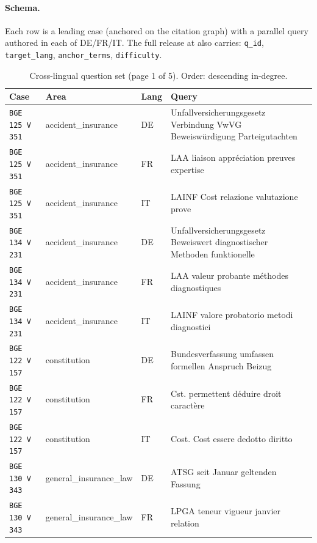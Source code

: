 \paragraph{Schema.} Each row is a leading case (anchored on the citation graph) with a parallel query authored in each of DE/FR/IT. The full release at  also carries: \texttt{q\_id}, \texttt{target\_lang}, \texttt{anchor\_terms}, \texttt{difficulty}.

\renewcommand{\arraystretch}{1.15}
\begin{table}[h]
\centering
\caption{Cross-lingual question set (page 1 of 5). Order: descending in-degree.}
\scriptsize
\setlength{\tabcolsep}{2pt}
\begin{tabular}{>{\raggedright\arraybackslash}p{2.2cm} >{\raggedright\arraybackslash}p{3.55cm} >{\raggedright\arraybackslash}p{0.8cm} >{\raggedright\arraybackslash}p{8.05cm}}
\toprule
\textbf{Case} & \textbf{Area} & \textbf{Lang} & \textbf{Query} \\
\midrule
\texttt{BGE 125 V 351} & accident\_insurance & DE & Unfallversicherungsgesetz Verbindung VwVG Beweiswürdigung Parteigutachten \\
\texttt{BGE 125 V 351} & accident\_insurance & FR & LAA liaison appréciation preuves expertise \\
\texttt{BGE 125 V 351} & accident\_insurance & IT & LAINF Cost relazione valutazione prove \\
\texttt{BGE 134 V 231} & accident\_insurance & DE & Unfallversicherungsgesetz Beweiswert diagnostischer Methoden funktionelle \\
\texttt{BGE 134 V 231} & accident\_insurance & FR & LAA valeur probante méthodes diagnostiques \\
\texttt{BGE 134 V 231} & accident\_insurance & IT & LAINF valore probatorio metodi diagnostici \\
\texttt{BGE 122 V 157} & constitution & DE & Bundesverfassung umfassen formellen Anspruch Beizug \\
\texttt{BGE 122 V 157} & constitution & FR & Cst. permettent déduire droit caractère \\
\texttt{BGE 122 V 157} & constitution & IT & Cost. Cost essere dedotto diritto \\
\texttt{BGE 130 V 343} & general\_insurance\_law & DE & ATSG seit Januar geltenden Fassung \\
\texttt{BGE 130 V 343} & general\_insurance\_law & FR & LPGA teneur vigueur janvier relation \\

\end{tabular}
\end{table}
